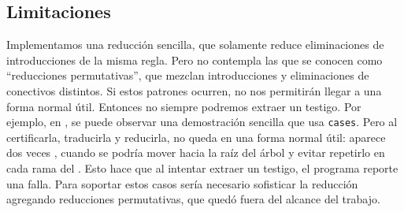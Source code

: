 \subsection{Limitaciones}
\label{fri:norm:sec:limitations}

Implementamos una reducción sencilla, que solamente reduce eliminaciones de introducciones de la misma regla. Pero no contempla las que se conocen como ``reducciones permutativas'', que mezclan introducciones y eliminaciones de conectivos distintos. Si estos patrones ocurren, no nos permitirán llegar a una forma normal útil. Entonces no siempre podremos extraer un testigo. Por ejemplo, en , se puede observar una demostración sencilla que usa \lstinline{cases}. Pero al certificarla, traducirla y reducirla, no queda en una forma normal útil: aparece dos veces , cuando se podría mover hacia la raíz del árbol y evitar repetirlo en cada rama del . Esto hace que al intentar extraer un testigo, el programa reporte una falla. Para soportar estos casos sería necesario sofisticar la reducción agregando reducciones permutativas, que quedó fuera del alcance del trabajo.

